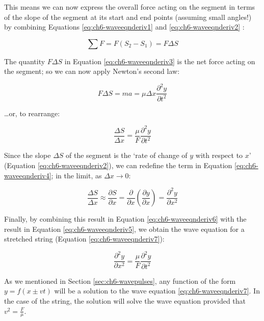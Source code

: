 \documentclass[
]{book}
\begin{document}
This means we can now express the overall force acting on the segment in terms of the slope of the segment at its start and end points (assuming small angles!) by combining Equations \eqref{eq:ch6-waveeqnderiv1} and \eqref{eq:ch6-waveeqnderiv2} :

\begin{equation}
\sum F = F(S_2 - S_1) = F \Delta S
\label{eq:ch6-waveeqnderiv3}
\end{equation}

The quantity \(F\Delta S\) in Equation \eqref{eq:ch6-waveeqnderiv3} is the net force acting on the segment; so we can now apply Newton's second law:

\begin{equation}
F\Delta S = m a = \mu \Delta x \frac{\partial^2 y}{\partial t^2}
\label{eq:ch6-waveeqnderiv4}
\end{equation}

\ldots or, to rearrange:

\begin{equation}
\frac{\Delta S}{\Delta x} = \frac{\mu}{F} \frac{\partial^2 y}{\partial t^2}
\label{eq:ch6-waveeqnderiv5}
\end{equation}

Since the slope \(\Delta S\) of the segment is the `rate of change of \(y\) with respect to \(x\)' (Equation \eqref{eq:ch6-waveeqnderiv2}), we can redefine the term in Equation \eqref{eq:ch6-waveeqnderiv4}; in the limit, as \(\Delta x \rightarrow 0\):

\begin{equation}
\frac{\Delta S}{\Delta x} \approx \frac{\partial S}{\partial x} = \frac{\partial}{\partial x} \left( \frac{\partial y}{\partial x} \right) = \frac{\partial^2 y}{\partial x^2}
\label{eq:ch6-waveeqnderiv6}
\end{equation}

Finally, by combining this result in Equation \eqref{eq:ch6-waveeqnderiv6} with the result in Equation \eqref{eq:ch6-waveeqnderiv5}, we obtain the wave equation for a stretched string (Equation \eqref{eq:ch6-waveeqnderiv7}):

\begin{equation}
\frac{\partial^2 y}{\partial x^2} = \frac{\mu}{F} \frac{\partial^2 y}{\partial t^2}
\label{eq:ch6-waveeqnderiv7}
\end{equation}

As we mentioned in Section \ref{sec:ch6-wavepulses}, any function of the form \(y = f(x \pm vt)\) will be a solution to the wave equation \eqref{eq:ch6-waveeqnderiv7}. In the case of the string, the solution will solve the wave equation provided that \(v^2 = \frac{F}{\mu}\).
\end{document}
